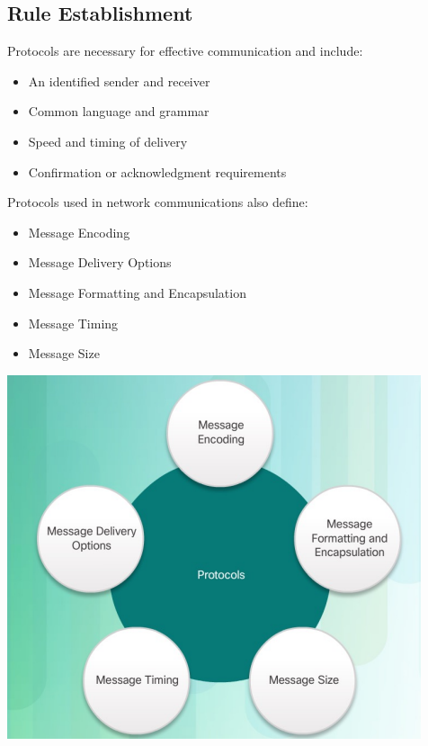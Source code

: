 \documentclass[11pt]{article}
\begin{document}
\subsection{Rule Establishment}
    Protocols are necessary for effective communication and include:
    \begin{itemize}
    \item An identified sender and receiver
    \item Common language and grammar
    \item Speed and timing of delivery
    \item Confirmation or acknowledgment requirements
    \end{itemize}
    Protocols used in network communications also define:
    \begin{itemize}
    \item Message Encoding
    \item Message Delivery Options
    \item Message Formatting and Encapsulation
    \item Message Timing 
    \item Message Size
    \end{itemize}
    \includegraphics[width=\textwidth]{rule-establishment}
\end{document}
